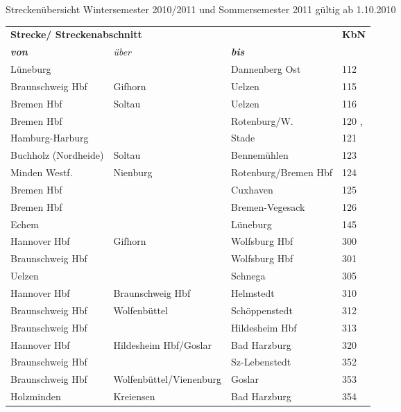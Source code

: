 Streckenübersicht Wintersemester 2010/2011 und Sommersemester 2011 gültig ab 1.10.2010

\enlargethispage{0.5cm} 
 
\begin{tabular}{|l|l|l|p{2cm}|}
\hline
\multicolumn{3}{|l|}{\textbf{Strecke/ Streckenabschnitt}}& \textbf{KbN}\\
\textbf{\textit{von}} & \textit{über} & \textbf{\textit{bis}} & \\ \cline{ 1- 4}
Lüneburg &  & Dannenberg Ost & 112 \\ \hline
Braunschweig Hbf & Gifhorn & Uelzen & 115 \\ \hline
Bremen Hbf & Soltau & Uelzen & 116 \\ \hline
Bremen Hbf &  & Rotenburg/W. & 120 \footnotemark[1], \footnotemark[3] \\ \hline
Hamburg-Harburg &  & Stade & 121 \\ \hline
Buchholz (Nordheide) & Soltau & Bennemühlen & 123 \\ \hline
Minden Westf. & Nienburg & Rotenburg/Bremen Hbf & 124 \\ \hline
Bremen Hbf &  & Cuxhaven & 125 \footnotemark[1] \\ \hline
Bremen Hbf &  & Bremen-Vegesack & 126 \footnotemark[1] \\ \hline
Echem &  & Lüneburg & 145 \\ \hline
Hannover Hbf & Gifhorn & Wolfsburg Hbf & 300 \\ \hline
Braunschweig Hbf &  & Wolfsburg Hbf & 301 \\ \hline
Uelzen &  & Schnega & 305 \\ \hline
Hannover Hbf & Braunschweig Hbf & Helmstedt & 310 \\ \hline
Braunschweig Hbf & Wolfenbüttel & Schöppenstedt & 312 \footnotemark[2] \\ \hline
Braunschweig Hbf &  & Hildesheim Hbf & 313 \\ \hline
Hannover Hbf & Hildesheim Hbf/Goslar & Bad Harzburg & 320 \\ \hline
Braunschweig Hbf &  & Sz-Lebenstedt & 352 \\ \hline
Braunschweig Hbf & Wolfenbüttel/Vienenburg & Goslar & 353 \\ \hline
Holzminden & Kreiensen & Bad Harzburg & 354 \\ \hline

\end{tabular}
